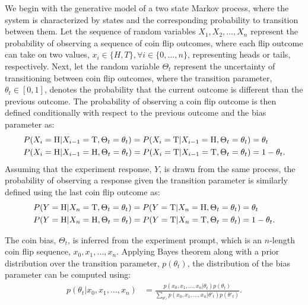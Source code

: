 \documentclass{article}
\begin{document}
We begin with the generative model of a two state Markov process, where the system is characterized by states and the corresponding probability to transition between them. Let the sequence of random variables $X_1, X_2, \dots, X_n$ represent the probability of observing a sequence of coin flip outcomes, where each flip outcome can take on two values, $x_i \in \{H,T\}, \forall i \in \{0, \dots, n\}$, representing heads or tails, respectively. Next, let the random variable $\Theta_t$ represent the uncertainty of transitioning between coin flip outcomes, where the transition parameter, $\theta_t \in [0,1]$, denotes the probability that the current outcome is different than the previous outcome. The probability of observing a coin flip outcome is then defined conditionally with respect to the previous outcome and the bias parameter as:
\begin{align}
    P(X_i = \textrm{H} | X_{i-1} = \textrm{T}, \Theta_t = \theta_t) = P(X_i = \textrm{T} | X_{i-1} = \textrm{H}, \Theta_t = \theta_t) &= \theta_t \notag \\ 
    P(X_i = \textrm{H} | X_{i-1} = \textrm{H}, \Theta_t = \theta_t) = P(X_i = \textrm{T} | X_{i-1} = \textrm{T}, \Theta_t = \theta_t) &= 1 - \theta_t \label{eq:tcoin_x}.
\end{align}
Assuming that the experiment response, $Y$, is drawn from the same process, the probability of observing a response given the transition parameter is similarly defined using the last coin flip outcome as: 
\begin{align}
    P(Y = \textrm{H} | X_n = \textrm{T}, \Theta_t = \theta_t) = P(Y = \textrm{T}| X_n = \textrm{H}, \Theta_t = \theta_t) &= \theta_t \notag \\ 
    P(Y = \textrm{H} | X_n = \textrm{H}, \Theta_t = \theta_t) = P(Y = \textrm{T} | X_n = \textrm{T}, \Theta_t = \theta_t) &= 1 - \theta_t \label{eq:tcoin_y}.
\end{align}

The coin bias, $\Theta_t$, is inferred from the experiment prompt, which is an $n$-length coin flip sequence, $x_0, x_1, \dots, x_n$. Applying Bayes theorem along with a prior distribution over the transition parameter, $p(\theta_t)$, the distribution of the bias parameter can be computed using:
\begin{align}
    p(\theta_t | x_0, x_1, \dots, x_n) &= \frac{p(x_0, x_1, \dots, x_n | \theta_t)p(\theta_t)} {\sum\limits_{\theta'_t} p(x_0, x_1, \dots, x_n | \theta'_t)p(\theta'_t)} \label{eq:tcoin_bayes}.
\end{align}
\end{document}
